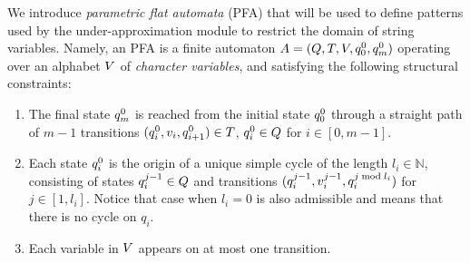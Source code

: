 \documentclass[sigplan,review,anonymous]{acmart}\settopmatter{printfolios=true,printccs=false,printacmref=false}
\begin{document}
We introduce \emph{parametric flat automata} (PFA) that will be used to define patterns 
used by the under-approximation module to restrict the domain of string variables. 
Namely, an PFA is a finite automaton $A = (Q,T,V,q_{0}^{0},q_{m}^{0})$ operating over an alphabet $V$ of \emph{character variables}, 
and satisfying the following structural constraints:
\begin{enumerate}
	\item The final state $q_{m}^{0}$ is reached from  the initial state $q_{0}^{0}$ through a straight path of $m-1$ transitions $(q_{i}^{0},v_i,q_{i+1}^{0}) \in T$, $q_{i}^{0} \in Q$ for $i\in[0,m-1]$. %
	\item  
Each state $q_{i}^{0}$ is the origin of a unique simple cycle of the length $l_i\in\mathbb{N}$, consisting of states $q_{i}^{j-1} \in Q$ and transitions $(q_{i}^{j-1}, v_{i}^{j-1}, q_{i}^{j \bmod l_i})$ for $j\in [1,l_i]$. 
Notice that case when $l_i = 0$ is also admissible and means that there is no cycle on $q_i$.
	\item Each variable in $V$ appears on at most one transition.%
\end{enumerate} 
\end{document}
